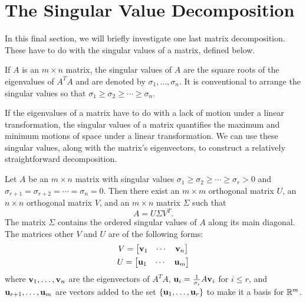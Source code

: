 \documentclass[../m073main.tex]{subfiles}
\begin{document}
\section{The Singular Value Decomposition}
In this final section, we will briefly investigate one last matrix decomposition.
These have to do with the singular values of a matrix, defined below.

\begin{definition}
	If $A$ is an $m \times n$ matrix, the singular values of $A$ are the square roots of the eigenvalues of $A^T A$ and are denoted by $\sigma_1, \ldots, \sigma_n$. It is conventional to arrange the singular values so that $\sigma_1 \geq \sigma_2 \geq \cdots \geq \sigma_n$.
\end{definition}

If the eigenvalues of a matrix have to do with a lack of motion under a linear transformation, the singular values of a matrix quantifies the maximum and minimum motions of space under a linear transformation.
We can use these singular values, along with the matrix's eigenvectors, to construct a relatively straightforward decomposition.

\begin{theorem}
	Let $A$ be an $m \times n$ matrix with singular values $\sigma_1 \geq \sigma_2 \geq \cdots \geq \sigma_r > 0$ and $\sigma_{r+1} = \sigma_{r+2} = \cdots = \sigma_n = 0$.
	Then there exist an $m \times m$ orthogonal matrix $U$, an $n \times n$ orthogonal matrix $V$, and an $m \times n$ matrix $\Sigma$ such that
	\[ A = U \Sigma V^T. \]
	The matrix $\Sigma$ contains the ordered singular values of $A$ along its main diagonal.
	The matrices other $V$ and $U$ are of the following forms:
	\begin{gather*}
		V = \begin{bmatrix} \mathbf{v}_1 & \cdots & \mathbf{v}_n \end{bmatrix} \\
		U = \begin{bmatrix} \mathbf{u}_1 & \cdots & \mathbf{u}_m \end{bmatrix}
	\end{gather*}
	where $\mathbf{v}_1, \ldots, \mathbf{v}_n$ are the eigenvectors of $A^T A$, $\mathbf{u}_i = \frac{1}{\sigma_i} A \mathbf{v}_i$ for $i \leq r$, and $\mathbf{u}_{r+1}, \ldots, \mathbf{u}_m$ are vectors added to the set $\{ \mathbf{u}_1, \ldots, \mathbf{u}_r \}$ to make it a basis for $\mathbb{R}^m$.
\end{theorem}
\end{document}
